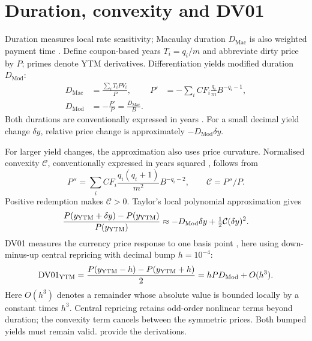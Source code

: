 \section{Duration, convexity and DV01}\label{sec:duration}
Duration measures local rate sensitivity; Macaulay duration \(D_{\mathrm{Mac}}\) is also weighted payment time \parencite{macaulay1938}. Define coupon-based years \(T_i=q_i/m\) and abbreviate dirty price by \(P\); primes denote YTM derivatives. Differentiation yields modified duration \(D_{\mathrm{Mod}}\):
\begin{align}
D_{\mathrm{Mac}}&=\frac{\sum_i T_iPV_i}{P},&
P'&=-\sum_i CF_i\frac{q_i}{m}B^{-q_i-1},\label{eq:price-first}\\
D_{\mathrm{Mod}}&=-\frac{P'}P=\frac{D_{\mathrm{Mac}}}{B}.\label{eq:duration}
\end{align}
Both durations are conventionally expressed in years \parencite{tuckman2011}. For a small decimal yield change \(\delta y\), relative price change is approximately \(-D_{\mathrm{Mod}}\delta y\).

\label{sec:convexity}
For larger yield changes, the approximation also uses price curvature. Normalised convexity \(\mathcal C\), conventionally expressed in years squared \parencite{tuckman2011}, follows from
\begin{equation}\label{eq:convexity}
P''=\sum_i CF_i\frac{q_i(q_i+1)}{m^2}B^{-q_i-2},\qquad \mathcal C=P''/P.
\end{equation}
Positive redemption makes \(\mathcal C>0\). Taylor's local polynomial approximation gives
\begin{equation}\label{eq:taylor-price}
\frac{P(y_{\mathrm{YTM}}+\delta y)-P(y_{\mathrm{YTM}})}{P(y_{\mathrm{YTM}})}
\approx-D_{\mathrm{Mod}}\delta y+\tfrac12\mathcal C(\delta y)^2.
\end{equation}
\label{sec:ytm-dv01}
DV01 measures the currency price response to one basis point \parencite{tuckman2011}, here using down-minus-up central repricing with decimal bump \(h=10^{-4}\):
\begin{equation}\label{eq:ytm-dv01}
\mathrm{DV01}_{\mathrm{YTM}}=\frac{P(y_{\mathrm{YTM}}-h)-P(y_{\mathrm{YTM}}+h)}2
=hPD_{\mathrm{Mod}}+O(h^3).
\end{equation}
Here \(O(h^3)\) denotes a remainder whose absolute value is bounded locally by a constant times \(h^3\). Central repricing retains odd-order nonlinear terms beyond duration; the convexity term cancels between the symmetric prices. Both bumped yields must remain valid.  provide the derivations.
